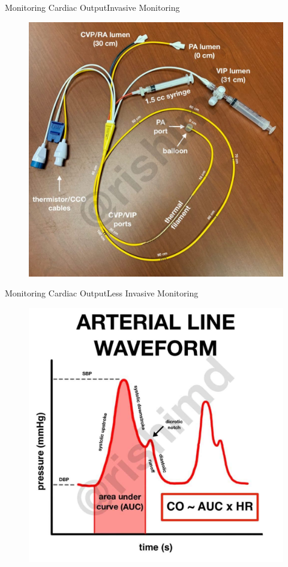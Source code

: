 \documentclass{beamer}
\begin{document}
	\begin{frame}{Monitoring Cardiac Output}{Invasive Monitoring}
		\begin{figure}
			\centering
			\includegraphics[height=0.8\textheight]{figures/icom-sgc}
			\label{fig:icom-sgc}
		\end{figure}
	\end{frame}
	\begin{frame}{Monitoring Cardiac Output}{Less Invasive Monitoring}
		\begin{figure}
			\centering
			\includegraphics[height=0.8\textheight]{figures/icom-arterial-wave-analysis}
			\label{fig:icom-arterial-wave-analysis}
		\end{figure}
	\end{frame}
\end{document}
